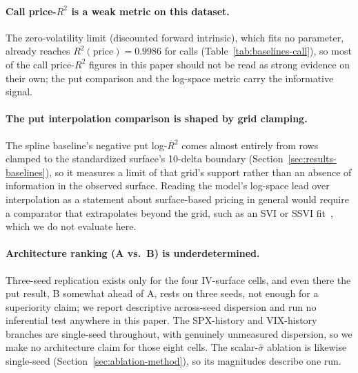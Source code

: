 \documentclass[11pt]{article}
\begin{document}
\paragraph{Call price-$R^2$ is a weak metric on this dataset.} The zero-volatility limit (discounted
forward intrinsic), which fits no parameter, already reaches $R^2(\text{price}) = 0.9986$ for calls
(Table~\ref{tab:baselines-call}), so most of the call price-$R^2$ figures in this paper should not be
read as strong evidence on their own; the put comparison and the log-space metric carry the
informative signal.

\paragraph{The put interpolation comparison is shaped by grid clamping.} The spline baseline's negative
put log-$R^2$ comes almost entirely from rows clamped to the standardized surface's 10-delta boundary
(Section~\ref{sec:results-baselines}), so it measures a limit of that grid's support rather than an
absence of information in the observed surface. Reading the model's log-space lead over interpolation
as a statement about surface-based pricing in general would require a comparator that extrapolates
beyond the grid, such as an SVI or SSVI fit~\citep{Gatheral2004SVI,GatherJacquier2014SSVI}, which we do
not evaluate here.

\paragraph{Architecture ranking (A vs.\ B) is underdetermined.} Three-seed replication exists only for
the four IV-surface cells, and even there the put result, B somewhat ahead of A, rests on three seeds,
not enough for a superiority claim; we report descriptive across-seed dispersion and run no
inferential test anywhere in this paper. The SPX-history and VIX-history branches are single-seed
throughout, with genuinely unmeasured dispersion, so we make no architecture claim for those eight
cells. The scalar-$\hat\sigma$ ablation is likewise single-seed (Section~\ref{sec:ablation-method}), so
its magnitudes describe one run.
\end{document}
